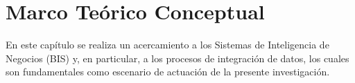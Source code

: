 \chapter{Marco Te\'orico Conceptual}\label{chapter:teoricframe}

En este capítulo se realiza un acercamiento a los Sistemas de Inteligencia de Negocios (BIS) y, en particular, 
a los procesos de integración de datos, los cuales son fundamentales como escenario de actuación de la presente 
investigación.
